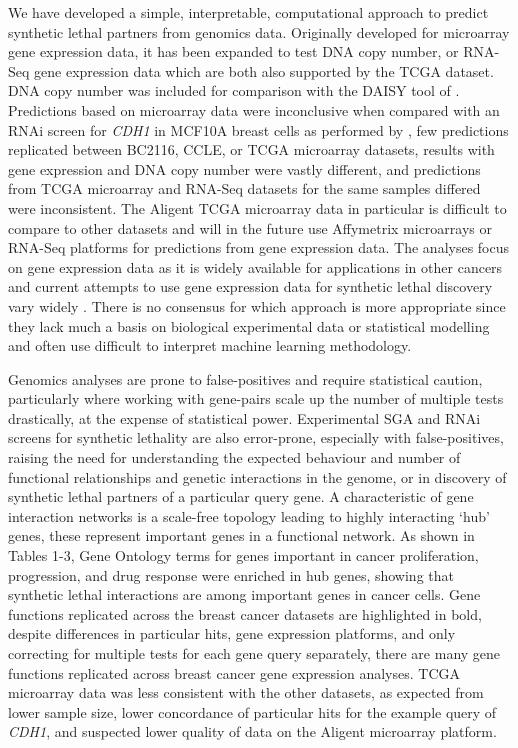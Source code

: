 We have developed a simple, interpretable, computational approach to predict synthetic lethal partners from genomics data.  Originally developed for microarray gene expression data, it has been expanded to test DNA copy number, or RNA-Seq gene expression data which are both also supported by the TCGA dataset.  DNA copy number was included for comparison with the DAISY tool of \citet{Jerby2014}.  Predictions based on microarray data were inconclusive when compared with an RNAi screen for \textit{CDH1} in MCF10A breast cells as performed by \citet{Telford2015}, few predictions replicated between BC2116, CCLE, or TCGA microarray datasets, results with gene expression and DNA copy number were vastly different, and predictions from TCGA microarray and RNA-Seq datasets for the same samples differed were inconsistent.  The Aligent TCGA microarray data in particular is difficult to compare to other datasets and will in the future use Affymetrix microarrays or RNA-Seq platforms for predictions from gene expression data.  The analyses focus on gene expression data as it is widely available for applications in other cancers and current attempts to use gene expression data for synthetic lethal discovery vary widely \citep{Jerby2014, Lu2015, Tiong2014}.  There is no consensus for which approach is more appropriate since they lack much a basis on biological experimental data or statistical modelling and often use difficult to interpret machine learning methodology.

Genomics analyses are prone to false-positives and require statistical caution, particularly where working with gene-pairs scale up the number of multiple tests drastically, at the expense of statistical power.  Experimental SGA and RNAi screens for synthetic lethality are also error-prone, especially with false-positives, raising the need for understanding the expected behaviour and number of functional relationships and genetic interactions in the genome, or in discovery of synthetic lethal partners of a particular query gene.  A characteristic of gene interaction networks is a scale-free topology leading to highly interacting ‘hub’ genes, these represent important genes in a functional network.  As shown in Tables 1-3, Gene Ontology terms for genes important in cancer proliferation, progression, and drug response were enriched in hub genes, showing that synthetic lethal interactions are among important genes in cancer cells.  Gene functions replicated across the breast cancer datasets are highlighted in bold, despite differences in particular hits, gene expression platforms, and only correcting for multiple tests for each gene query separately, there are many gene functions replicated across breast cancer gene expression analyses.  TCGA microarray data was less consistent with the other datasets, as expected from lower sample size, lower concordance of particular hits for the example query of \textit{CDH1}, and suspected lower quality of data on the Aligent microarray platform.

